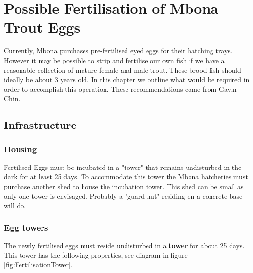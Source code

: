 \chapter{Possible Fertilisation of Mbona Trout Eggs}
 
 Currently, Mbona purchases pre-fertilised eyed eggs for their hatching trays. However it may be possible to
 strip and fertilise our own fish if we have a reasonable collection of mature female and male trout.
 These brood fish should ideally be about 3 years old. In this chapter we outline what would be required in order to accomplish this operation. These recommendations come from Gavin Chin.
 
 \section{Infrastructure}
 
 \subsection{Housing}
 Fertilised Eggs must be incubated in a "tower" that remains undisturbed in the dark for at least
 25 days. To accommodate this tower the Mbona hatcheries must purchase another shed to house the
 incubation tower. This shed can be small as only one tower is envisaged. Probably a "guard hut" residing
 on a concrete base will do.
 
\subsection{Egg towers}

The newly fertilised eggs must reside undisturbed in a {\bf tower} for about 25 days. This tower has the
following properties, see diagram in figure \ref{fig:FertilisationTower}.

